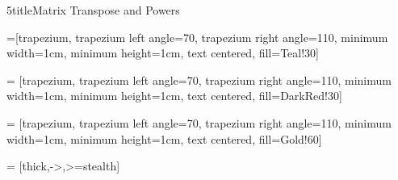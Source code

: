 5title{Matrix Transpose and Powers}
\subtitle{\SubTitleName}
\institute[]{\Course}
\author{\Instructor}
\maketitle   


 =[trapezium, trapezium left angle=70, trapezium right angle=110, minimum width=1cm, minimum height=1cm, text centered, fill=Teal!30]

 = [trapezium, trapezium left angle=70, trapezium right angle=110, minimum width=1cm, minimum height=1cm, text centered, fill=DarkRed!30]

 = [trapezium, trapezium left angle=70, trapezium right angle=110, minimum width=1cm, minimum height=1cm, text centered, fill=Gold!60]

 = [thick,->,>=stealth]









